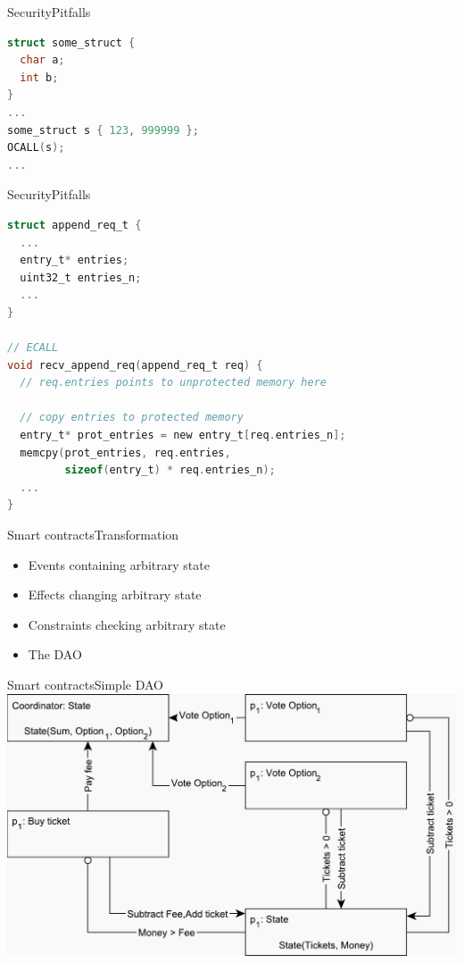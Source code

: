 \documentclass{beamer}
\begin{document}
\begin{frame}[fragile]{Security}{Pitfalls}%
  \vfill
  \begin{lstlisting}[language=C, basicstyle=\footnotesize\ttfamily, keywordstyle=\color{mLightBrown}]
struct some_struct {
  char a;
  int b;
}
...
some_struct s { 123, 999999 };
OCALL(s);
...
  \end{lstlisting}
  \vfill
\end{frame}

\begin{frame}[fragile]{Security}{Pitfalls}%
  \vfill
  \begin{lstlisting}[language=C, basicstyle=\footnotesize\ttfamily, keywordstyle=\color{mLightBrown}, commentstyle=\color{gray}]
struct append_req_t {
  ...
  entry_t* entries;
  uint32_t entries_n;
  ...
}

// ECALL
void recv_append_req(append_req_t req) {
  // req.entries points to unprotected memory here

  // copy entries to protected memory
  entry_t* prot_entries = new entry_t[req.entries_n];
  memcpy(prot_entries, req.entries,
         sizeof(entry_t) * req.entries_n);
  ...
}
  \end{lstlisting}
  \vfill
\end{frame}

\begin{frame}{Smart contracts}{Transformation}%
    \begin{itemize}
    	\item Events containing arbitrary state
    	\vfill
    	\item Effects changing arbitrary state
    	\vfill
    	\item Constraints checking arbitrary state
    	\vfill
    	\item The DAO
    \end{itemize}
\end{frame}

\begin{frame}{Smart contracts}{Simple DAO}
	\centering
	\includegraphics[scale=0.5]{figures/dao-simple.pdf}
\end{frame}
\end{document}
